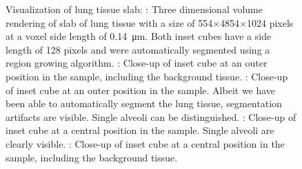 \begin{figure}[htp]
{%
		 	\label{subfig:LungSlabDetailsRedBG}%
			}%
		\caption{Visualization of lung tissue slab: %
			: Three dimensional volume rendering of slab of lung tissue with a size of 554$\times$4854$\times$1024 pixels at a voxel side length of \SI{0.14}{\micro\meter}. Both inset cubes have a side length of 128 pixels and were automatically segmented using a region growing algorithm. 
	 		: Close-up of inset cube at an outer position in the sample, including the background tissue. %
	 		: Close-up of inset cube at an outer position in the sample. Albeit we have been able to automatically segment the lung tissue, segmentation artifacts are visible. Single alveoli can be distinguished. %
	 		: Close-up of inset cube at a central position in the sample. Single alveoli are clearly visible. %
	 		: Close-up of inset cube at a central position in the sample, including the background tissue.%
	 		}%
		\label{fig:LungSlabSophie}%
	\end{figure}
\fi